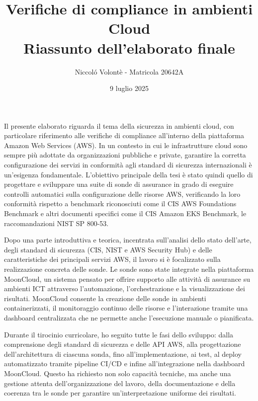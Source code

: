 \documentclass[12pt]{article}
\begin{document}
\title{
    Verifiche di compliance in ambienti Cloud \\
    \large Riassunto dell'elaborato finale
}
\author{Niccoló Volontè - Matricola 20642A}

\date{9 luglio 2025}

\maketitle

Il presente elaborato riguarda il tema della sicurezza in ambienti cloud, con particolare riferimento alle verifiche di compliance all'interno della piattaforma Amazon Web Services (AWS). In un contesto in cui le infrastrutture cloud sono sempre più adottate da organizzazioni pubbliche e private, garantire la corretta configurazione dei servizi in conformità agli standard di sicurezza internazionali è un'esigenza  fondamentale. L'obiettivo principale della tesi è stato quindi quello di progettare e sviluppare una suite di sonde di assurance in grado di eseguire controlli automatici sulla configurazione delle risorse AWS, verificando la loro conformità rispetto a benchmark riconosciuti come il CIS AWS Foundations Benchmark e altri documenti specifici come il CIS Amazon EKS Benchmark, le raccomandazioni NIST SP 800-53.

Dopo una parte introduttiva e teorica, incentrata sull'analisi dello stato dell'arte, degli standard di sicurezza (CIS, NIST e AWS Security Hub) e delle caratteristiche dei principali servizi AWS, il lavoro si è focalizzato sulla realizzazione concreta delle sonde. Le sonde sono state integrate nella piattaforma MoonCloud, un sistema pensato per offrire supporto alle attività di assurance su ambienti ICT attraverso l'automazione, l'orchestrazione e la visualizzazione dei risultati. MoonCloud consente la creazione delle sonde in ambienti containerizzati, il monitoraggio continuo delle risorse e l'interazione tramite una dashboard centralizzata che ne permette anche l'esecuzione manuale o pianificata.

Durante il tirocinio curricolare, ho seguito tutte le fasi dello sviluppo: dalla comprensione degli standard di sicurezza e delle API AWS, alla progettazione dell'architettura di ciascuna sonda, fino all'implementazione, ai test, al deploy automatizzato tramite pipeline CI/CD e infine all'integrazione nella dashboard MoonCloud. Questo ha richiesto non solo capacità tecniche, ma anche una gestione attenta dell'organizzazione del lavoro, della documentazione e della coerenza tra le sonde per garantire un'interpretazione uniforme dei risultati.
\end{document}
